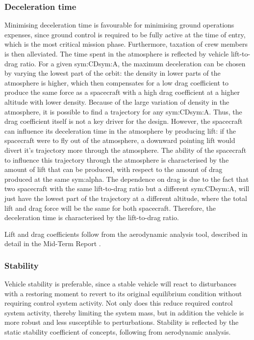 \subsubsection{Deceleration time}
Minimising deceleration time is favourable for minimising ground operations expenses, since ground control is required to be fully active at the time of entry, which is the most critical mission phase. Furthermore, taxation of crew members is then alleviated. The time spent in the atmosphere is reflected by vehicle lift-to-drag ratio. For a given \gls{sym:CD}\gls{sym:A}, the maximum deceleration can be chosen by varying the lowest part of the orbit: the density in lower parts of the atmosphere is higher, which then compensates for a low drag coefficient to produce the same force as a spacecraft with a high drag coefficient at a higher altitude with lower density. Because of the large variation of density in the atmosphere, it is possible to find a trajectory for any \gls{sym:CD}\gls{sym:A}. Thus, the drag coefficient itself is not a key driver for the design. However, the spacecraft can influence its deceleration time in the atmosphere by producing lift: if the spacecraft were to fly out of the atmosphere, a downward pointing lift would divert it's trajectory more through the atmosphere. The ability of the spacecraft to influence this trajectory through the atmosphere is characterised by the amount of lift that can be produced, with respect to the amount of drag produced at the same \gls{sym:alpha}. The dependence on drag is due to the fact that two spacecraft with the same lift-to-drag ratio but a different \gls{sym:CD}\gls{sym:A}, will just have the lowest part of the trajectory at a different altitude, where the total lift and drag force will be the same for both spacecraft. Therefore, the deceleration time is characterised by the  lift-to-drag ratio. 

Lift and drag coefficients follow from the aerodynamic analysis tool, described in detail in the Mid-Term Report \cite[p.34-46]{Balasooriyan2015b}.

\subsubsection{Stability}
Vehicle stability is preferable, since a stable vehicle will react to disturbances with a restoring moment to revert to its original equilibrium condition without requiring control system activity. Not only does this reduce required control system activity, thereby limiting the system mass, but in addition the vehicle is more robust and less susceptible to perturbations. Stability is reflected by the static stability coefficient of concepts, following from aerodynamic analysis.

